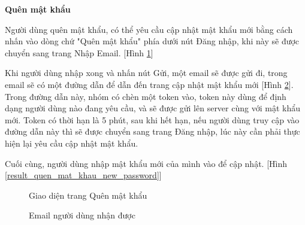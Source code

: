 \textbf{Quên mật khẩu}

Người dùng quên mật khẩu, có thể yêu cầu cập nhật mật khẩu mới bằng cách nhấn vào dòng chứ "Quên mật khẩu" phía dưới nút Đăng nhập, khi này sẽ được chuyển sang trang Nhập Email. [Hình \ref{result_quen_mat_khau_email}]\par
Khi người dùng nhập xong và nhấn nút Gửi, một email sẽ được gửi đi, trong email sẽ có một đường dẫn để dẫn đến trang cập nhật mật khẩu mới [Hình \ref{result_quen_mat_khau_email_receive}]. Trong đường dẫn này, nhóm có chèn một token vào, token này dùng để định dạng người dùng nào đang yêu cầu, và sẽ được gửi lên server cùng với mật khẩu mới. Token có thời hạn là 5 phút, sau khi hết hạn, nếu người dùng truy cập vào đường dẫn này thì sẽ được chuyển sang trang Đăng nhập, lúc này cần phải thực hiện lại yêu cầu cập nhật mật khẩu.\par
Cuối cùng, người dùng nhập mật khẩu mới của mình vào để cập nhật. [Hình \ref{result_quen_mat_khau_new_password}]

\begin{figure}[H]
    \begin{center}
        \caption{Giao diện trang Quên mật khẩu}
        \label{result_quen_mat_khau_email}
    \end{center}
\end{figure}

\begin{figure}[H]
    \begin{center}
        \caption{Email người dùng nhận được}
        \label{result_quen_mat_khau_email_receive}
    \end{center}
\end{figure}

